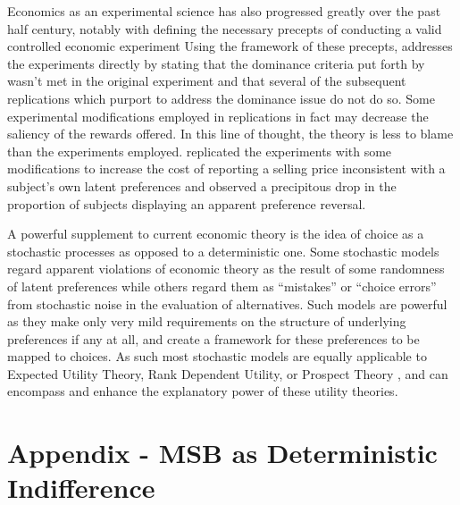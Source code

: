\documentclass[../main.tex]{subfiles}
\begin{document}
Economics as an experimental science has also progressed greatly over the past half century, notably with \textcite{Smith1982} defining the necessary precepts of conducting a valid controlled economic experiment
Using the framework of these precepts, \textcite{Harrison1994} addresses the \textcite{Grether1979} experiments directly by stating that the dominance criteria put forth by \textcite{Smith1982} wasn't met in the original experiment and that several of the subsequent replications which purport to address the dominance issue do not do so.
Some experimental modifications employed in replications in fact may decrease the saliency of the rewards offered.
In this line of thought, the theory is less to blame than the experiments employed.
\textcite[236-239]{Harrison1994} replicated the \textcite{Grether1979} experiments with some modifications to increase the cost of reporting a selling price inconsistent with a subject's own latent preferences and observed a precipitous drop in the proportion of subjects displaying an apparent preference reversal.

A powerful supplement to current economic theory is the idea of choice as a stochastic processes as opposed to a deterministic one.
Some stochastic models regard apparent violations of economic theory as the result of some randomness of latent preferences while others regard them as \enquote{mistakes} or \enquote{choice errors} from stochastic noise in the evaluation of alternatives.
Such models are powerful as they make only very mild requirements on the structure of underlying preferences if any at all, and create a framework for these preferences to be mapped to choices.
As such most stochastic models are equally applicable to Expected Utility Theory, Rank Dependent Utility, or Prospect Theory \parencite{Kahneman1979, Tversky1992}, and can encompass and enhance the explanatory power of these utility theories.

\newpage
\singlespacing
\section*{Appendix - MSB as Deterministic Indifference}
\doublespacing
{}%
\end{document}
